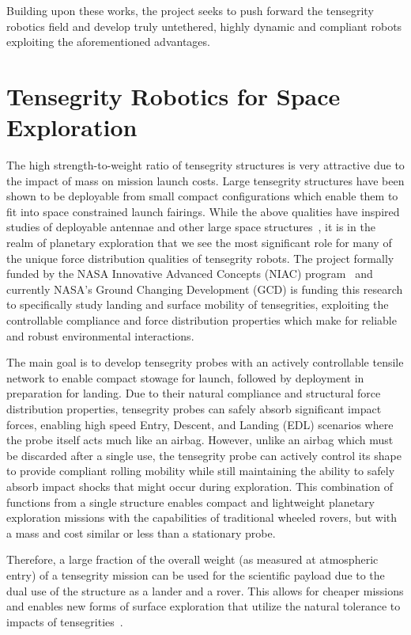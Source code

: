 Building upon these works, the \SB{} project seeks to push forward the tensegrity robotics field and develop truly untethered, highly dynamic and compliant robots exploiting the aforementioned advantages.

\section{Tensegrity Robotics for Space Exploration}
The high strength-to-weight ratio of tensegrity structures is very attractive due to the impact of mass on mission launch costs. 
Large tensegrity structures have been shown to be deployable from small compact configurations which enable them to fit into space constrained launch fairings.   
While the above qualities have inspired studies of deployable antennae and other large space structures~\cite{Tibert2002}, 
it is in the realm of planetary exploration that we see the most significant role for many of the unique force distribution qualities of tensegrity robots.  
The project formally funded by the NASA Innovative Advanced Concepts (NIAC) program~\cite{NIACfinalreport} and currently NASA's Ground Changing Development (GCD) is funding this research to specifically study landing and surface mobility of tensegrities,
exploiting the controllable compliance and force distribution properties which make for reliable and robust environmental interactions.  

The main goal is to develop tensegrity probes with an actively controllable tensile network
 to enable compact stowage for launch, followed by deployment in preparation for landing. 
Due to their natural compliance and 
structural force distribution properties, tensegrity probes can safely absorb 
significant impact forces, enabling high speed Entry, Descent, and Landing 
(EDL) scenarios where the probe itself acts much like an airbag.  However, 
unlike an airbag which must be discarded after a single use, the tensegrity 
probe can actively control its shape to provide compliant rolling mobility 
while still maintaining the ability to safely absorb impact shocks that might 
occur during exploration.  This combination of functions from a single 
structure enables compact and lightweight planetary exploration missions 
with the capabilities of traditional wheeled rovers, but with a mass and 
cost similar or less than a stationary probe.   

Therefore, a large fraction of the overall weight (as measured at atmospheric entry) of a tensegrity mission can be used for the scientific payload 
due to the dual use of the structure as a lander and a rover. 
This allows for cheaper missions and enables new forms of surface exploration that utilize the natural tolerance to impacts of tensegrities~\cite{Vytas_IPPW_2013}.

